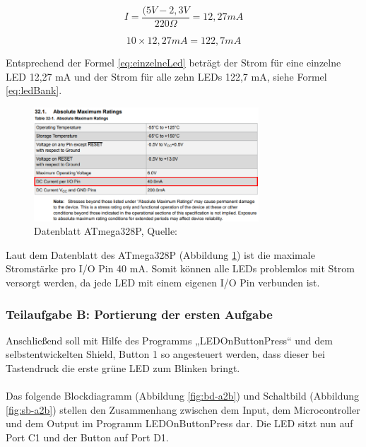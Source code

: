 \documentclass{article}
\begin{document}
\begin{equation}
    I = \frac{(5V-2,3V}{220 \Omega} = 12,27 mA
    \label{eq:einzelneLed}
\end{equation}

\begin{equation}
    10 \times 12,27 mA = 122,7 mA
    \label{eq:ledBank}
\end{equation}

\noindent Entsprechend der Formel \ref{eq:einzelneLed} beträgt der Strom für eine einzelne LED 12,27 mA und der Strom für alle zehn LEDs 122,7 mA, siehe Formel \ref{eq:ledBank}. 

\begin{figure}[htb]
    \centering
    \includegraphics[width=0.75\textwidth]{images/tabelle-atmega.png}
    \caption{Datenblatt ATmega328P, Quelle: \cite{AtmelDatasheet}}
    \label{fig:datenblatt-atmega}
\end{figure}

\noindent Laut dem Datenblatt des ATmega328P (Abbildung \ref{fig:datenblatt-atmega}) ist die maximale Stromstärke pro I/O Pin 40 mA. Somit können alle LEDs problemlos mit Strom versorgt werden, da jede LED mit einem eigenen I/O Pin verbunden ist.

\subsubsection{Teilaufgabe B: Portierung der ersten Aufgabe}

\noindent Anschließend soll mit Hilfe des Programms „LEDOnButtonPress“ und dem selbstentwickelten Shield, Button 1 so angesteuert werden, dass dieser bei Tastendruck die erste grüne LED zum Blinken bringt.
\\
\\
Das folgende Blockdiagramm (Abbildung \ref{fig:bd-a2b}) und Schaltbild (Abbildung \ref{fig:sb-a2b}) stellen den Zusammenhang zwischen dem Input, dem Microcontroller und dem Output im Programm LEDOnButtonPress dar. Die LED sitzt nun auf Port C1 und der Button auf Port D1. \\
\end{document}
